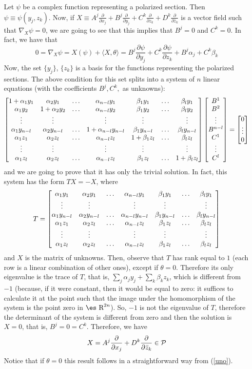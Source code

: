 \documentclass[12pt]{article}
\def\beq{\begin{equation}}
\def\eeq{\end{equation}}
\def\dst{\(}
\def\derpar#1#2{\frac{\partial{#1}}{\partial{#2}}}
\def\qed{\ifvmode\removelastskip\fi
{\unskip\nobreak\hfil\penalty50\hbox{}\nobreak\hfil
\hbox{\vrule height1.2ex width1.2ex}\parfillskip=0pt
\finalhyphendemerits=0 \par\smallskip}}
\def\P{{\cal P}}
\def\Real{\mbox{\es R}}
\begin{document}
Let $\psi$ be a complex function representing a polarized section.
Then $\psi \equiv \psi (y_j,z_k)$. Now, if
\dst X \equiv A^j \derpar{}{x_j} + B^j \derpar{}{y_j}
+ C^k \derpar{}{z_k} + D^k \derpar{}{\bar z_k}\)
is a vector field such that  $\nabla_X\psi = 0$,
we are going to see that this implies that
$B^j=0$ and $C^k=0$.
In fact, we have that
\beq
0 = \nabla_X\psi = X(\psi ) + \langle X,\theta \rangle =
B^j \derpar{\psi}{y_j} + C^k \derpar{\psi}{z_k}
+ B^j\alpha_j + C^k\beta_k
\label{uno}
\eeq
Now, the set $\{ y_j \}$,  $\{ z_k \}$
is a basis for the functions representing the polarized sections.
The above condition for this set splits into
a system of $n$ linear equations
(with the coefficients $B^j, C^k,$
as unknowns):
$$
\left[\begin{matrix}
1+\alpha_1y_1 & \alpha_2y_1 & \ldots & \alpha_{n-l}y_1 &
\beta_1y_1 & \ldots & \beta_ly_1 \cr
\alpha_1y_2 & 1+ \alpha_2y_2 & \ldots & \alpha_{n-l}y_2 &
\beta_1y_2 & \ldots & \beta_ly_2 \cr
\vdots & \vdots & & \vdots & \vdots & & \vdots \cr
\alpha_1y_{n-l} & \alpha_2y_{n-l} & \ldots &1+\alpha_{n-l}y_{n-l} &
\beta_1y_{n-l} & \ldots & \beta_ly_{n-l} \cr
\alpha_1z_1 & \alpha_2z_l & \ldots &\alpha_{n-l}z_l &
1+\beta_1z_l & \ldots & \beta_lz_l \cr
\vdots & \vdots & & \vdots & \vdots & & \vdots \cr
\alpha_1z_l & \alpha_2z_l & \ldots &\alpha_{n-l}z_l &
\beta_1z_l & \ldots & 1+\beta_lz_l \cr
\end{matrix}\right]
\left[\begin{matrix}
B^1 \cr B^2 \cr \vdots \cr B^{n-l} \cr C^1 \cr \vdots \cr C^l\end{matrix}\right]
= \left[\begin{matrix}0 \cr \vdots \cr 0 \cr\end{matrix}\right]
$$
and we are going to prove that it has only
the trivial solution. In fact, this system
has the form $TX=-X$, where
$$
T = \left[\begin{matrix}
\alpha_1y_1 & \alpha_2y_1 & \ldots & \alpha_{n-l}y_1 &
\beta_1y_1 & \ldots & \beta_ly_1 \cr
\vdots & \vdots & & \vdots & \vdots & & \vdots \cr
\alpha_1y_{n-l} & \alpha_2y_{n-l} & \ldots &\alpha_{n-l}y_{n-l} &
\beta_1y_{n-l} & \ldots & \beta_ly_{n-l} \cr
\alpha_1z_1 & \alpha_2z_l & \ldots &\alpha_{n-l}z_l &
\beta_1z_l & \ldots & \beta_lz_l \cr
\vdots & \vdots & & \vdots & \vdots & & \vdots \cr
\alpha_1z_l & \alpha_2z_l & \ldots &\alpha_{n-l}z_l &
\beta_1z_l & \ldots & \beta_lz_l \cr
\end{matrix}\right]
$$
and $X$ is the matrix of unknowns.
Then, observe that $T$ has rank equal to $1$
(each row is a linear combination of other ones),
except if $\theta = 0$.
Therefore its only eigenvalue is the trace of $T$,
that is, $\sum_j\alpha_jy_j+\sum_k\beta_kz_k$,
which is different from $-1$
(because, if it were constant, then it would be equal to zero:
it suffices to calculate it at the point such that
the image under the homomorphism of the system is the
point zero in $\Real^{2n}$).
So, $-1$ is not the eigenvalue of $T$,
therefore the determinant of the system is different from zero
and then the solution is $X=0$,
that is, $B^j = 0 = C^k$.
Therefore, we have
$$
X = A^j \derpar{}{x_j} + D^k \derpar{}{\bar z_k} \in \P
$$
Notice that if $\theta = 0$ this result follows
in a straightforward way from
(\ref{uno}).
\qed
\end{document}
